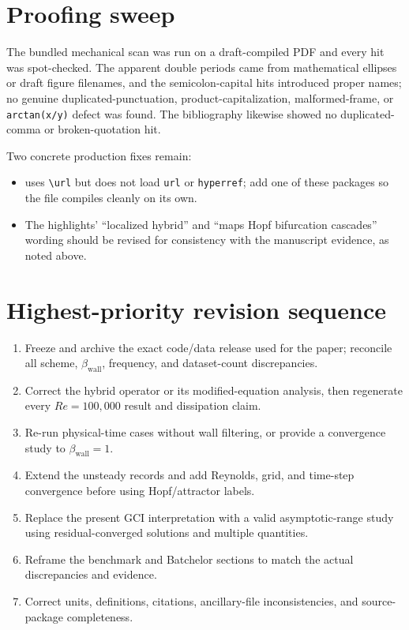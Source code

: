 \documentclass[11pt,a4paper]{article}
\begin{document}
\section*{Proofing sweep}

The bundled mechanical scan was run on a draft-compiled PDF and every hit was spot-checked. The apparent double periods came from mathematical ellipses or draft figure filenames, and the semicolon-capital hits introduced proper names; no genuine duplicated-punctuation, product-capitalization, malformed-frame, or \texttt{arctan(x/y)} defect was found. The bibliography likewise showed no duplicated-comma or broken-quotation hit.

Two concrete production fixes remain:
\begin{itemize}
  \item {} uses \verb|\url| but does not load \texttt{url} or \texttt{hyperref}; add one of these packages so the file compiles cleanly on its own.
  \item The highlights' ``localized hybrid'' and ``maps Hopf bifurcation cascades'' wording should be revised for consistency with the manuscript evidence, as noted above.
\end{itemize}

\section*{Highest-priority revision sequence}

\begin{enumerate}
  \item Freeze and archive the exact code/data release used for the paper; reconcile all scheme, $\beta_{\mathrm{wall}}$, frequency, and dataset-count discrepancies.
  \item Correct the hybrid operator or its modified-equation analysis, then regenerate every $Re=100{,}000$ result and dissipation claim.
  \item Re-run physical-time cases without wall filtering, or provide a convergence study to $\beta_{\mathrm{wall}}=1$.
  \item Extend the unsteady records and add Reynolds, grid, and time-step convergence before using Hopf/attractor labels.
  \item Replace the present GCI interpretation with a valid asymptotic-range study using residual-converged solutions and multiple quantities.
  \item Reframe the benchmark and Batchelor sections to match the actual discrepancies and evidence.
  \item Correct units, definitions, citations, ancillary-file inconsistencies, and source-package completeness.
\end{enumerate}
\end{document}
